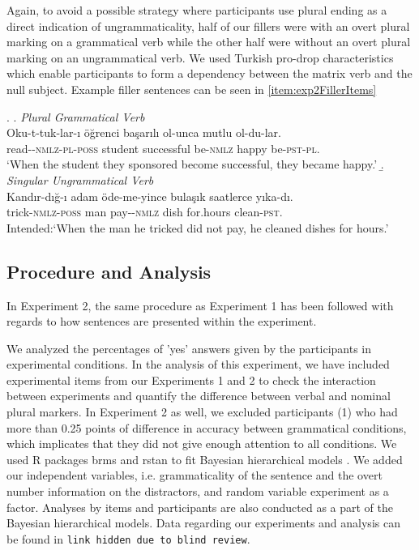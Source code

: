 \documentclass[doc,a4paper,man,natbib,floatsintext,noextraspace]{apa6}\usepackage[]{graphicx}\usepackage[]{color}
\begin{document}
Again, to avoid a possible strategy where participants use plural ending as a direct indication of ungrammaticality, half of our fillers were with an overt plural marking on a grammatical verb while the other half were without an overt plural marking on an ungrammatical verb. We used Turkish pro-drop characteristics which enable participants to form a dependency between the matrix verb and the null subject. Example filler sentences can be seen in \ref{item:exp2FillerItems} 

\ex. \label{item:exp2FillerItems}
\a. \textit{Plural Grammatical Verb}\\ 
\gll Oku-t-tuk-lar-ı öğrenci başarılı ol-unca mutlu ol-du-lar.\\ 
read-\Caus{}-\textsc{nmlz}-\textsc{pl}-\textsc{poss}  student successful be-\textsc{nmlz} happy be-\textsc{pst}-\textsc{pl}.\\
\glt `When the student they sponsored become successful, they became happy.' 
\b. \textit{Singular Ungrammatical Verb}\\ 
\gll *Kandır-dığ-ı adam öde-me-yince bulaşık saatlerce yıka-dı.\\ 
trick-\textsc{nmlz}-\textsc{poss}  man pay-\Neg{}-\textsc{nmlz} dish for.hours clean-\textsc{pst}.\\
\glt Intended:`When the man he tricked did not pay, he cleaned dishes for hours.'


\subsection{Procedure and Analysis} \label{sec:exp2:procedure_analysis}





In Experiment 2, the same procedure as Experiment 1 has been followed with regards to how sentences are presented within the experiment. 

We analyzed the percentages of 'yes' answers given by the participants in experimental conditions. In the analysis of this experiment, we have included experimental items from our Experiments 1 and 2 to check the interaction between experiments and quantify the difference between verbal and nominal plural markers. In Experiment 2 as well, we excluded participants (1) who had more than 0.25 points of difference in accuracy between grammatical conditions, which implicates that they did not give enough attention to all conditions. We used R packages brms \citep{R-brms_b} and rstan \citep{R-stan} to fit Bayesian hierarchical models \citep{GelmanHill:2007}. We added our independent variables, i.e. grammaticality of the sentence and the overt number information on the distractors, and random variable experiment as a factor. Analyses by items and participants are also conducted as a 
part of the Bayesian hierarchical models. Data regarding our experiments and analysis can be found in \texttt{link hidden due to blind review}.
\end{document}
